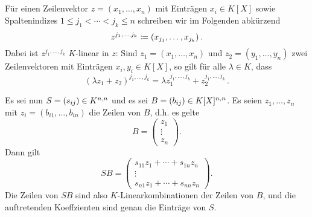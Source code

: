 \section{}


Für einen Zeilenvektor $z = (x_1, \dotsc, x_n)$ mit Einträgen $x_i \in K[X]$ sowie Spaltenindizes $1 \leq j_1 < \dotsb < j_k \leq n$ schreiben wir im Folgenden abkürzend
\[
            z^{j_1, \dotsc, j_k}
  \defined  (x_{j_1}, \dotsc, x_{j_k}) \,.
\]
Dabei ist $z^{j_1, \dotsc, j_k}$ $K$-linear in $z$:
Sind $z_1 = (x_1, \dotsc, x_n)$ und $z_2 = (y_1, \dotsc, y_n)$ zwei Zeilenvektoren mit Einträgen $x_i, y_i \in K[X]$, so gilt für alle $\lambda \in K$, dass
\[
    (\lambda z_1 + z_2)^{j_1, \dotsc, j_k}
  = \lambda z_1^{j_1, \dotsc, j_k} + z_2^{j_1, \dotsc, j_k} \,.
\]

Es sei nun $S = (s_{ij}) \in \matrices{n}{K}$ und es sei $B = (b_{ij}) \in \matrices{n}{K[X]}$.
Es seien $z_1, \dotsc, z_n$ mit $z_i = (b_{i1}, \dotsc, b_{in})$ die Zeilen von $B$, d.h. es gelte
\[
    B 
  = \begin{pmatrix}
      z_1     \\
      \vdots  \\
      z_n
    \end{pmatrix}.
\]
Dann gilt
\[
    S B
  = \begin{pmatrix}
      s_{11} z_1 + \dotsb + s_{1n} z_n \\
      \vdots                                        \\
      s_{n1} z_1 + \dotsb + s_{nn} z_n
    \end{pmatrix}.
\]
Die Zeilen von $SB$ sind also $K$-Linearkombinationen der Zeilen von $B$, und die auftretenden Koeffzienten sind genau die Einträge von $S$.

